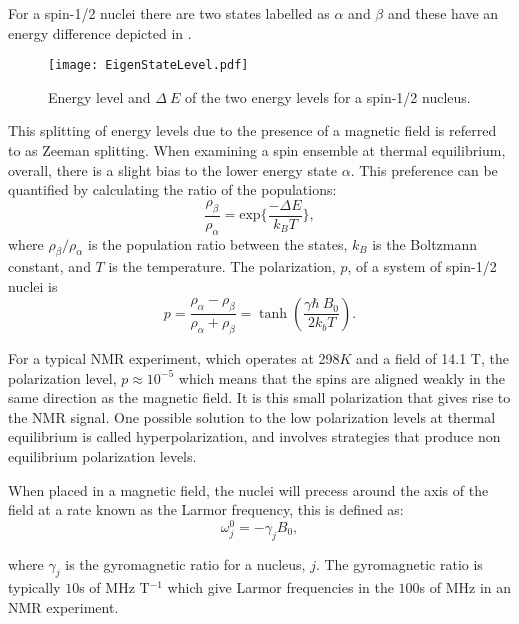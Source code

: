 For a spin-1/2 nuclei there are two states labelled as $\alpha$ and $\beta$
and these have an energy difference depicted in .

\begin{figure}[ht]
  \begin{center}
  \texttt{[image: EigenStateLevel.pdf]}
  \end{center}
  \caption{Energy level and $\Delta~E$ of the two energy levels for a spin-1/2 nucleus.}
  \label{fig:EnergySplit}
\end{figure}

This splitting of energy levels due to the presence of a magnetic field is referred to as Zeeman splitting.
When examining a spin ensemble at thermal equilibrium, overall, there is a slight bias to the lower energy
state $\alpha$. This preference can be quantified by calculating the ratio of the populations:
\begin{equation}\label{eqn:Boltzmann}
  \frac{\rho_{\beta}}{\rho_{\alpha}} = \text{exp}\{\frac{-\Delta{E}}{k_B T}\},
\end{equation}
where $\rho_{\beta}/\rho_{\alpha}$ is the population ratio between the states, $k_B$ is the Boltzmann constant, and $T$ is the temperature. The polarization, $p$, of a system of
spin-1/2 nuclei is
\begin{equation}\label{eqn:Polarization}
  p = \frac{\rho_\alpha - \rho_\beta}{\rho_\alpha + \rho_\beta} = \tanh(\frac{\gamma\hbar~B_0}{2k_bT}).
\end{equation}

For a typical NMR experiment, which operates at 298$K$ and
a field of 14.1 T, the polarization level, $p \approx 10^{-5}$ which means that the spins are aligned weakly
in the same direction as the magnetic field. It is this small polarization that gives rise to the NMR
signal. One possible solution to the low polarization levels at thermal equilibrium is called hyperpolarization, and
involves strategies that produce non equilibrium polarization levels.

When placed in a magnetic field, the nuclei will precess around the axis of the field at a rate known as the Larmor frequency, this is defined as:
\begin{equation}\label{eqn:Larmor}
  \omega_j^0 = -\gamma_jB_0,
\end{equation}

where $\gamma_j$ is the gyromagnetic ratio for a nucleus, $j$. The gyromagnetic ratio is
typically $10$s of MHz T$^{-1}$ which give Larmor frequencies in the $100$s of MHz in an NMR
experiment.


